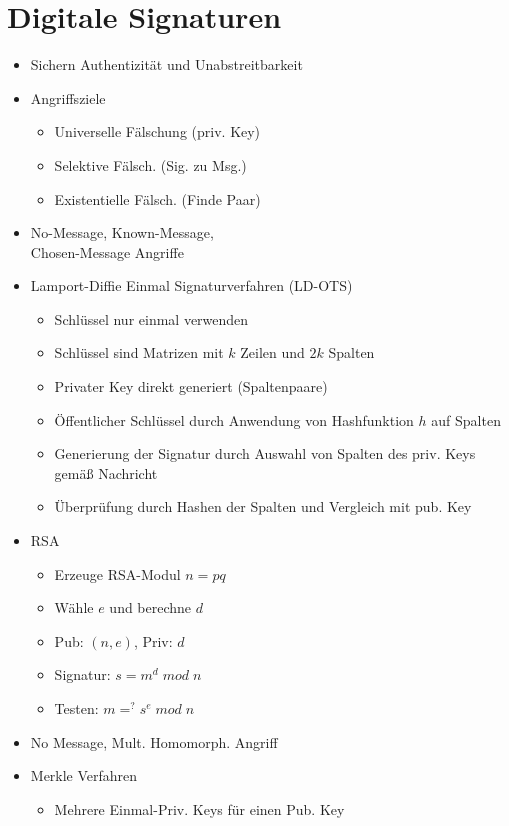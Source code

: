 \documentclass[11pt, paper=a4, twocolumn]{scrartcl}
\begin{document}
	\section{Digitale Signaturen}
		\begin{itemize}
			\item Sichern Authentizität und Unabstreitbarkeit
			\item Angriffsziele
				\begin{itemize}
					\item Universelle Fälschung (priv. Key)
					\item Selektive Fälsch. (Sig. zu Msg.)
					\item Existentielle Fälsch. (Finde Paar)
				\end{itemize}
			\item No-Message, Known-Message,\\
				Chosen-Message Angriffe
			\item Lamport-Diffie Einmal Signaturverfahren (LD-OTS)
				\begin{itemize}
					\item Schlüssel nur einmal verwenden
					\item Schlüssel sind Matrizen mit $k$ Zeilen und $2k$ Spalten
					\item Privater Key direkt generiert (Spaltenpaare)
					\item Öffentlicher Schlüssel durch Anwendung von Hashfunktion $h$ auf Spalten
					\item Generierung der Signatur durch Auswahl von Spalten des priv. Keys gemäß Nachricht
					\item Überprüfung durch Hashen der Spalten und Vergleich mit pub. Key
				\end{itemize}
			\item RSA
				\begin{itemize}
					\item Erzeuge RSA-Modul $n=pq$
					\item Wähle $e$ und berechne $d$
					\item Pub: $(n,e)$, Priv: $d$
					\item Signatur: $s=m^d\;mod\;n$
					\item Testen: $m=^?s^e\;mod\;n$
				\end{itemize}
			\item No Message, Mult. Homomorph. Angriff
			\item Merkle Verfahren
				\begin{itemize}
					\item Mehrere Einmal-Priv. Keys für einen Pub. Key

\end{itemize}
\end{itemize}
\end{document}

